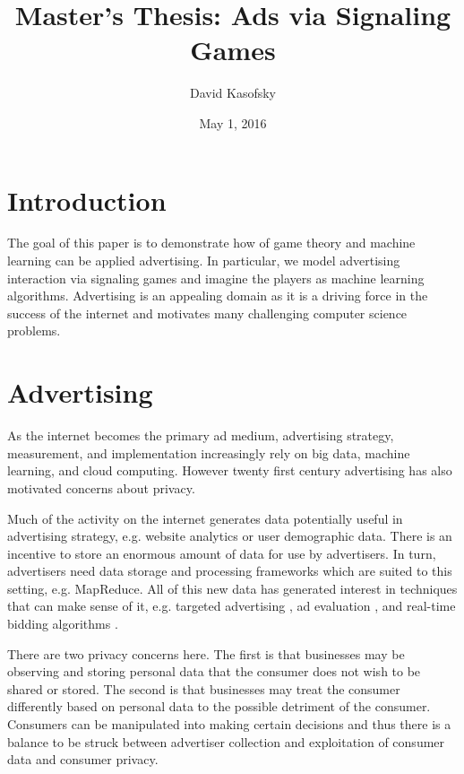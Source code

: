 \documentclass{article}
\title{Master's Thesis: Ads via Signaling Games}
\author{David Kasofsky}
\date{May 1, 2016}
\begin{document}
\maketitle

\newpage

\tableofcontents

\newpage

\section{Introduction}

The goal of this paper is to demonstrate how of game theory and machine learning can be applied advertising. In particular, we model advertising interaction via signaling games and imagine the players as machine learning algorithms. Advertising is an appealing domain as it is a driving force in the success of the internet and motivates many challenging computer science problems.

\section{Advertising}
As the internet becomes the primary ad medium\cite{iab1}, advertising strategy, measurement, and implementation increasingly rely on big data, machine learning, and cloud computing. However twenty first century advertising has also motivated concerns about privacy.

Much of the activity on the internet generates data potentially useful in advertising strategy, e.g. website analytics or user demographic data. There is an incentive to store an enormous amount of data for use by advertisers. In turn, advertisers need data storage and processing frameworks which are suited to this setting, e.g. MapReduce\cite{mapreduce1}. All of this new data has generated interest in techniques that can make sense of it, e.g. targeted advertising \cite{displayadsml1}, ad evaluation \cite{abhishek2012media}, and real-time bidding algorithms \cite{yuan2014survey}.

There are two privacy concerns here. The first is that businesses may be observing and storing personal data that the consumer does not wish to be shared or stored. The second is that businesses may treat the consumer differently based on personal data to the possible detriment of the consumer. Consumers can be manipulated into making certain decisions \cite{akerlof2015phishing} and thus there is a balance to be struck between advertiser collection and exploitation of consumer data and consumer privacy.
\end{document}
